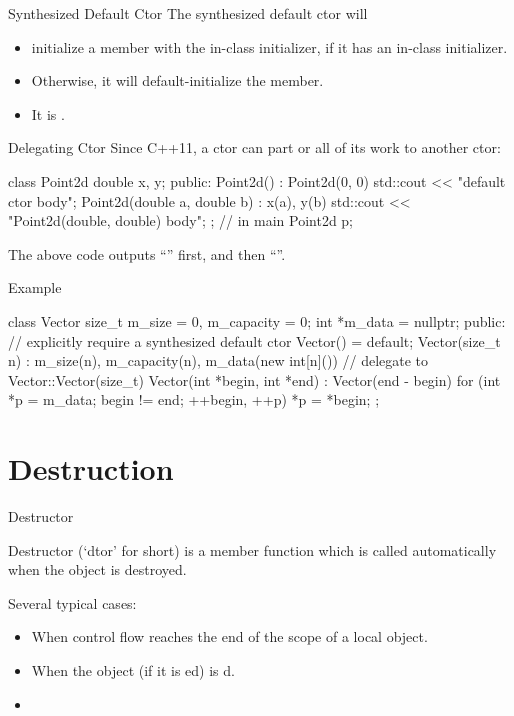 \documentclass{beamer}
\begin{document}
\begin{frame}{Synthesized Default Ctor}
    The synthesized default ctor will
    \begin{itemize}
        \item initialize a member with the in-class initializer, if it has an in-class initializer.
        \item Otherwise, it will default-initialize the member.
        \item It is .
    \end{itemize}
\end{frame}

\begin{frame}[fragile]{Delegating Ctor}
    Since C++11, a ctor can  part or all of its work to another ctor:
    \begin{cpp}
class Point2d {
  double x, y;
 public:
  Point2d() : Point2d(0, 0) {
    std::cout << "default ctor body\n";
  }
  Point2d(double a, double b) : x(a), y(b) {
    std::cout << "Point2d(double, double) body\n";
  }
};
// in main
Point2d p;
    \end{cpp}
    The above code outputs ``'' first, and then ``''.
\end{frame}

\begin{frame}[fragile]{Example}
    \begin{cpp}
class Vector {
  size_t m_size = 0, m_capacity = 0;
  int *m_data = nullptr;
 public:
  // explicitly require a synthesized default ctor
  Vector() = default;
  Vector(size_t n) : m_size(n), m_capacity(n),
    m_data(new int[n]()) {}
  // delegate to Vector::Vector(size_t)
  Vector(int *begin, int *end) : Vector(end - begin) {
    for (int *p = m_data; begin != end; ++begin, ++p)
      *p = *begin;
  }
};
    \end{cpp}
\end{frame}

\section{Destruction}

\begin{frame}{Destructor}
    \begin{definition}[Destructor]
        Destructor (`dtor' for short) is a member function which is called automatically when the object is destroyed.
    \end{definition}
    Several typical cases:
    \begin{itemize}
        \item When control flow reaches the end of the scope of a local object.
        \item When the object (if it is ed) is d.
        \item {}
    \end{itemize}
\end{frame}
\end{document}
